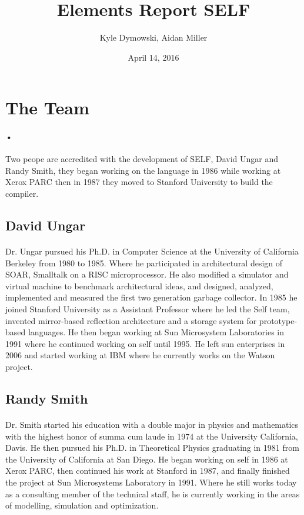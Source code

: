 \documentclass[12pt]{article}
\title{Elements Report SELF}
\author{Kyle Dymowski, Aidan Miller}
\date{April 14, 2016}
\begin{document}
\maketitle

\section{The Team}
\paragraph{•} Two peope are accredited with the development of SELF, David Ungar and Randy Smith, they began working on the language in 1986 while working at Xerox PARC then in 1987 they moved to Stanford University to build the compiler. 
\subsection{David Ungar}
\paragraph{} Dr. Ungar pursued his Ph.D. in Computer Science at the University of California Berkeley from 1980 to 1985. Where he participated in architectural design of SOAR, Smalltalk on a RISC microprocessor. He also modified a simulator and virtual machine to benchmark architectural ideas, and designed, analyzed, implemented and measured the first two generation garbage collector. In 1985 he joined Stanford University as a Assistant Professor where he led the Self team, invented mirror-based reflection architecture and a storage system for prototype-based languages. He then began working at Sun Microsystem Laboratories in 1991 where he continued working on self until 1995. He left sun enterprises in 2006 and started working at IBM where he currently works on the Watson project. \cite{ungar}

\subsection{Randy Smith}
\paragraph{} Dr. Smith started his education with a double major in physics and mathematics with the highest honor of summa cum laude in 1974 at the University California, Davis. He then pursued his Ph.D. in Theoretical Physics graduating in 1981 from the University of California at San Diego. He began working on self in 1986 at Xerox PARC, then continued his work at Stanford in 1987, and finally finished the project at Sun Microsystems Laboratory in 1991. Where he still works today as a consulting member of the technical staff, he is currently working in the areas of modelling, simulation and optimization. \cite{smith}
\end{document}
